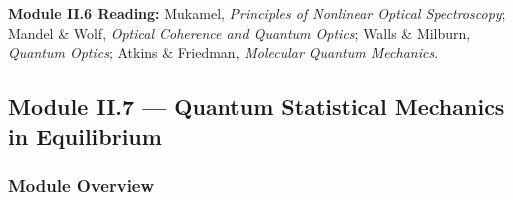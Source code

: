 \documentclass[11pt,a4paper]{article}
\begin{document}
\begin{tcolorbox}[highlightbox]
\textbf{Module II.6 Reading:} Mukamel, \textit{Principles of Nonlinear Optical Spectroscopy}; Mandel \& Wolf, \textit{Optical Coherence and Quantum Optics}; Walls \& Milburn, \textit{Quantum Optics}; Atkins \& Friedman, \textit{Molecular Quantum Mechanics}.
\end{tcolorbox}

\subsection{Module II.7 --- Quantum Statistical Mechanics in Equilibrium}
\label{sec:mod-II7}

\subsubsection*{Module Overview}
\end{document}
